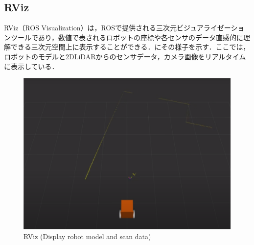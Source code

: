 \newpage

\subsection{RViz}

  RViz（ROS Visualization）\cite{rviz}は，ROSで提供される三次元ビジュアライゼーションツールであり，数値で表されるロボットの座標や各センサのデータ直感的に理解できる三次元空間上に表示することができる．にその様子を示す．ここでは，ロボットのモデルと2DLiDARからのセンサデータ，カメラ画像をリアルタイムに表示している．

  \begin{figure}[h]
    \centering
    \includegraphics[keepaspectratio, scale=0.60] {images/eps/RobotGuidance_rviz}
    \caption{RViz (Display robot model and scan data)}
    \label{Fig:RobotGuidance_rviz}
  \end{figure}

\newpage